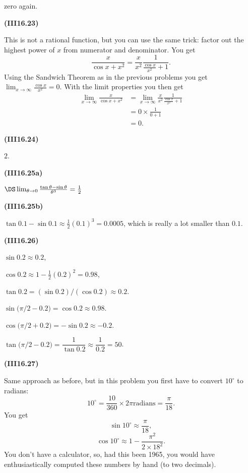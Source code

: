 \documentclass[openany,reqno]{amsbook}
\begin{document}
\begin{trivlist}
  zero again.
  \bigskip

\item[{\bf(III16.23)}]

  This is not a rational function, but you can use the same trick:  factor out the
  highest power of $x$ from numerator and denominator.  You get
  \[
    \frac{x}{\cos x + x^2}
    = \frac{x}{x^2} \frac{1}{\frac{\cos x}{x^2} + 1}.
  \]
  Using the Sandwich Theorem as in the previous problems you get
  $\lim_{x\to\infty} \frac{\cos x}{x^2} = 0$.  With the limit properties you then
  get
  \begin{align*}
    \lim_{x\to\infty}\frac{x}{\cos x + x^2}
    &= \lim_{x\to\infty}\frac{x}{x^2} \frac{1}{\frac{\cos x}{x^2} + 1}\\
    &= 0\times \frac{1}{0+1} \\
    &= 0.
  \end{align*}

  \bigskip

\item[{\bf(III16.24)}]

  $2$.
  \bigskip

\item[{\bf(III16.25a)}]

  $\DS \lim_{\theta\to0}\frac{\tan\theta - \sin\theta}{\theta^3} =
  \frac{1}{2}$
  \bigskip

\item[{\bf(III16.25b)}]

  $\tan0.1 - \sin 0.1 \approx \frac{1}{2}(0.1)^{3} = 0.0005$, which is
  really a lot smaller than $0.1$.
  \bigskip

\item[{\bf(III16.26)}]

  $\sin0.2 \approx 0.2$,

  $\cos{0.2} \approx 1-\frac12(0.2)^2 = 0.98$,

  $\tan{0.2} = (\sin{0.2})/(\cos{0.2}) \approx 0.2$.

  $\sin \bigl(\pi/2 - 0.2\bigr) = \cos 0.2 \approx 0.98$.

  $\cos \bigl(\pi/2 + 0.2\bigr) = -\sin 0.2 \approx -0.2$.

  $\tan \bigl(\pi/2 - 0.2\bigr) = \dfrac1{\tan 0.2} \approx \dfrac1{0.2} = 50$.

  \bigskip

\item[{\bf(III16.27)}]

  Same approach as before, but in this problem you first have to convert
  $10^\circ$ to radians:
  \[
    10^\circ = \frac{10}{360}\times2\pi \textrm{radians} = \frac{\pi}{18}.
  \]
  You get
  \[
    \sin 10^\circ \approx \frac{\pi}{18},
  \]
  \[
    \cos 10^\circ \approx 1 - \frac{\pi^2}{2\times18^2}.
  \]
  You don't have a calculator, so, had this been 1965, you would have
  enthusiastically computed these numbers by hand (to two decimals).


\end{trivlist}
\end{document}

